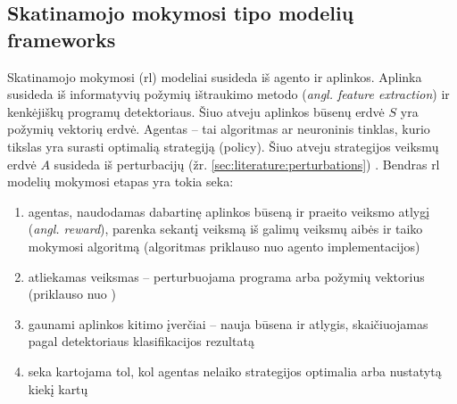 \subsection{Skatinamojo mokymosi tipo modelių \glspl{framework}}\label{sec:literature:rl}

Skatinamojo mokymosi (\acs{rl}) modeliai susideda iš agento ir aplinkos.
Aplinka susideda iš informatyvių požymių ištraukimo metodo (\textit{angl.
    feature extraction}) ir kenkėjiškų programų detektoriaus. Šiuo atveju aplinkos
būsenų erdvė $S$ yra požymių vektorių erdvė. Agentas -- tai algoritmas ar neuroninis
tinklas, kurio tikslas yra surasti optimalią strategiją (\gls{policy}). Šiuo
atveju strategijos veiksmų erdvė $A$ susideda iš perturbacijų (žr.
\ref{sec:literature:perturbations}) \citeplace. Bendras \ac{rl} modelių
mokymosi etapas yra tokia seka:
\begin{enumerate}
    \item agentas, naudodamas dabartinę aplinkos būseną ir praeito veiksmo atlygį
          (\textit{angl. reward}), parenka sekantį veiksmą iš galimų veiksmų aibės ir taiko mokymosi algoritmą (algoritmas priklauso nuo agento implementacijos)
    \item atliekamas veiksmas -- perturbuojama programa arba požymių vektorius (priklauso
          nuo )
    \item gaunami aplinkos kitimo įverčiai -- nauja būsena ir atlygis, skaičiuojamas
          pagal detektoriaus klasifikacijos rezultatą
    \item seka kartojama tol, kol agentas nelaiko strategijos optimalia arba nustatytą
          kiekį kartų
\end{enumerate}
\citeplace{}

